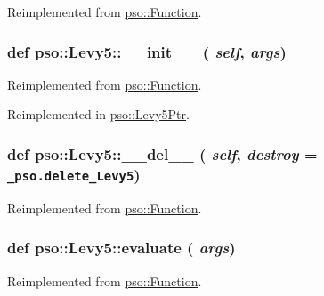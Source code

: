 Reimplemented from \hyperlink{classpso_1_1Function_959f07a6de4f333461fdb0261e6c25ae}{pso::Function}.\hypertarget{classpso_1_1Levy5_3499ee5a0ad4b26fb90f4aeb8b899585}{
\subsubsection{\setlength{\rightskip}{0pt plus 5cm}def pso::Levy5::\_\-\_\-init\_\-\_\- ( {\em self}, \/   {\em args})}}
\label{classpso_1_1Levy5_3499ee5a0ad4b26fb90f4aeb8b899585}




Reimplemented from \hyperlink{classpso_1_1Function_6874097c6476dc85af64b40e76a807e9}{pso::Function}.

Reimplemented in \hyperlink{classpso_1_1Levy5Ptr_01f10ada921645bf0be74d8073c0c764}{pso::Levy5Ptr}.\hypertarget{classpso_1_1Levy5_b19922a937c1d22b02f24853a96bf271}{
\subsubsection{\setlength{\rightskip}{0pt plus 5cm}def pso::Levy5::\_\-\_\-del\_\-\_\- ( {\em self}, \/   {\em destroy} = {\tt \_\-pso.delete\_\-Levy5})}}
\label{classpso_1_1Levy5_b19922a937c1d22b02f24853a96bf271}




Reimplemented from \hyperlink{classpso_1_1Function_c80bd40fcf4a956e5732ed099bccc598}{pso::Function}.\hypertarget{classpso_1_1Levy5_7de80ec535099658cfc10dac658aaf4e}{
\subsubsection{\setlength{\rightskip}{0pt plus 5cm}def pso::Levy5::evaluate ( {\em args})}}
\label{classpso_1_1Levy5_7de80ec535099658cfc10dac658aaf4e}




Reimplemented from \hyperlink{classpso_1_1Function_7c958ea6d942a89ae219b872b4d73541}{pso::Function}.

